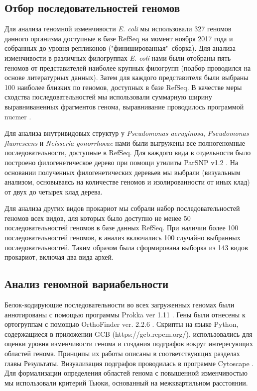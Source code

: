\subsection{Отбор последовательностей геномов}
Для анализа геномной изменчивости \textit{E. coli} мы использовали 327 геномов данного организма доступные в базе RefSeq на момент ноября 2017 года и собранных до уровня репликонов ("финишированная"\ сборка). Для анализа изменчивости в различных филогруппах \textit{E. coli} нами были отобраны пять геномов от представителей наиболее крупных филогрупп (подбор проводился на основе литературных данных). Затем для каждого представителя были выбраны 100 наиболее близких по геномов, доступных в базе RefSeq. В качестве меры сходства последовательностей мы использовали суммарную ширину выравниваненных фрагментов генома, выравнивание проводилось программой nucmer \cite{marccais2018mummer4}. 

Для анализа внутривидовых структур у \textit{Pseudomonas aeruginosa}, \textit{Pseudomonas fluorescens} и \textit{Neisseria gonorrhoeae} нами были выгружены все полногеномные последовательности, доступные в RefSeq. Для каждого вида в отдельности было построено филогенетическое дерево при помощи утилиты ParSNP v1.2 \cite{treangen2014harvest}. На основании полученных филогенетических деревьев мы выбрали (визуальным анализом, основываясь на количестве геномов и изолированности от иных клад) от двух до четырех клад дерева. 

Для анализа других видов прокариот мы собрали набор последовательностей геномов всех видов, для которых было доступно не менее 50 последовательностей геномов в базе данных RefSeq. При наличии более 100 последовательностей геномов, в анализ включались 100 случайно выбранных последовательностей. Таким образом была сформирована выборка из 143 видов прокариот, включая два вида архей.

\subsection{Анализ геномной вариабельности}
Белок-кодирующие последовательности во всех загруженных геномах были аннотированы с помощью программы Prokka ver 1.11 \cite{seemann2014prokka}. Гены были отнесены к ортогруппам с помощью OrthoFinder ver. 2.2.6 \cite{emms2015orthofinder}. Скрипты на языке Python, содержащиеся в приложении GCB (https://gcb.rcpcm.org/), использовались для оценки уровня изменчивости генома и создания подграфов вокруг интересующих областей генома. Принципы их работы описаны в соответствующих разделах главы Результаты. Визуализация подграфов проводилась в программе Cytoscape \cite{smoot2011cytoscape}. Для формализации определения областей генома с повышенной изменчивостью мы использовали критерий Тьюки, основанный на межквартильном расстоянии.


